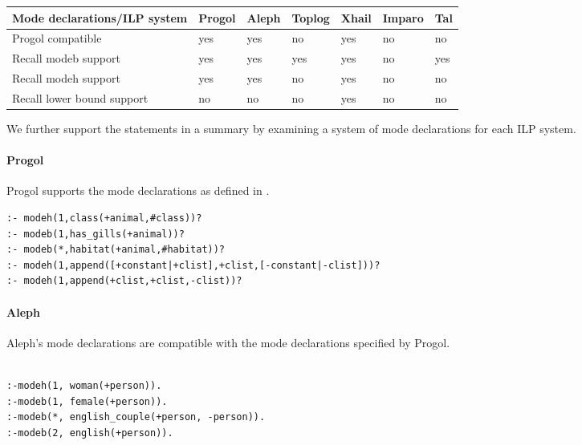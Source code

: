 \begin{center}
 \label{tab:classification_by_mode_declaration_bias} 
 \begin{tabular}{| l | l | l | l | l | l | l |}
    \hline
    Mode declarations/ILP system & Progol & Aleph & Toplog & Xhail & Imparo & Tal \\ \hline
    Progol compatible & yes & yes & no &  yes & no & no \\ \hline
    Recall modeb support & yes & yes & yes & yes & no & yes \\ \hline
    Recall modeh support & yes & yes & no & yes & no & no \\ \hline
    Recall lower bound support & no & no & no & yes & no & no \\ \hline
  \end{tabular}
  \end{center}

We further support the statements in a summary by examining a system of mode declarations for each ILP system.

\paragraph{Progol}
Progol supports the mode declarations as defined in .

\begin{exmp}\cite{muggleton1999progolWebsite}
\begin{lstlisting}
:- modeh(1,class(+animal,#class))?
:- modeb(1,has_gills(+animal))?
:- modeb(*,habitat(+animal,#habitat))?
:- modeh(1,append([+constant|+clist],+clist,[-constant|-clist]))?
:- modeh(1,append(+clist,+clist,-clist))?
\end{lstlisting}
\end{exmp}

\paragraph{Aleph}
Aleph's mode declarations are compatible\cite{aleph2007} with the mode declarations specified by Progol.
\begin{exmp}
\begin{lstlisting}

:-modeh(1, woman(+person)).
:-modeb(1, female(+person)).
:-modeb(*, english_couple(+person, -person)).
:-modeb(2, english(+person)).
\end{lstlisting}
\end{exmp}

